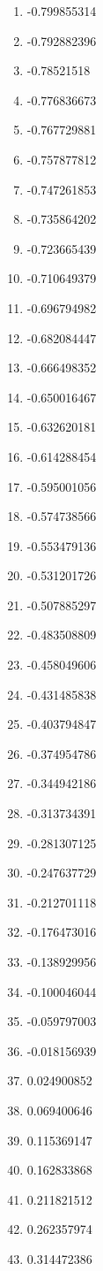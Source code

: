 \documentclass[6pt]{article}
\begin{document}
\begin{multicols}{4}
\begin{enumerate}
		\item -0.799855314
		\item -0.792882396
		\item -0.78521518
		\item -0.776836673
		\item -0.767729881
		\item -0.757877812
		\item -0.747261853
		\item -0.735864202
		\item -0.723665439
		\item -0.710649379
		\item -0.696794982
		\item -0.682084447
		\item -0.666498352
		\item -0.650016467
		\item -0.632620181
		\item -0.614288454
		\item -0.595001056
		\item -0.574738566
		\item -0.553479136
		\item -0.531201726
		\item -0.507885297
		\item -0.483508809
		\item -0.458049606
		\item -0.431485838
		\item -0.403794847
		\item -0.374954786
		\item -0.344942186
		\item -0.313734391
		\item -0.281307125
		\item -0.247637729
		\item -0.212701118
		\item -0.176473016
		\item -0.138929956
		\item -0.100046044
		\item -0.059797003
		\item -0.018156939
		\item 0.024900852
		\item 0.069400646
		\item 0.115369147
		\item 0.162833868
		\item 0.211821512
		\item 0.262357974
		\item 0.314472386

\end{enumerate}
\end{multicols}
\end{document}
